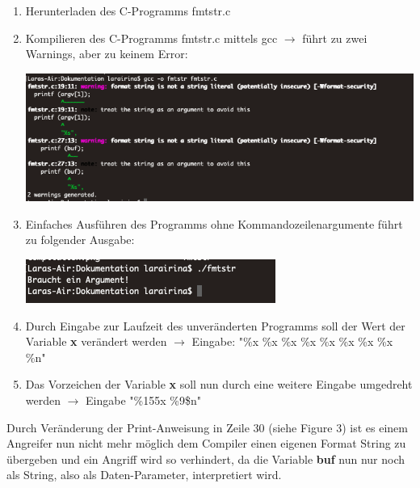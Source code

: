 \documentclass[12pt,a4paper]{article}
\begin{document}
	\begin{enumerate}
		\item Herunterladen des C-Programms fmtstr.c
		\item Kompilieren des C-Programms fmtstr.c mittels gcc $\rightarrow$ führt zu zwei Warnings, aber zu keinem Error:
			\begin{center}
			\includegraphics[scale=0.3]{compilation.png}
			\end{center}
		\item Einfaches Ausführen des Programms ohne Kommandozeilenargumente führt zu folgender Ausgabe:
		\begin{center}
			\includegraphics[scale=0.8]{ohneCmdln.png}
		\end{center}
		\item Durch Eingabe zur Laufzeit des unveränderten Programms soll der Wert der Variable \textbf{x} verändert werden  $\rightarrow$ Eingabe: "\%x \%x \%x \%x \%x \%x \%x \%x \%n"
		\item Das Vorzeichen der Variable \textbf{x} soll nun durch eine weitere Eingabe umgedreht werden $\rightarrow$ Eingabe "\%155x \%9\$n"
	\end{enumerate}

	Durch Veränderung der Print-Anweisung in Zeile 30 (siehe Figure 3) ist es einem Angreifer nun nicht mehr möglich dem Compiler einen eigenen Format String zu übergeben und ein Angriff wird so verhindert, da die Variable \textbf{buf} nun nur noch als String, also als Daten-Parameter, interpretiert wird.
\end{document}
